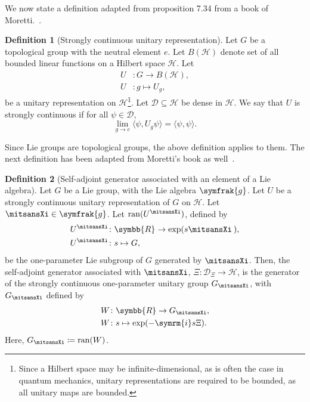 \documentclass[12pt, a4 paper]{article}
\let\symcal\mathcal
\theoremstyle{definition}
\newtheorem{defn}{Definition}
\newcommand{\rr}{\symbb{R}}
\newcommand{\hilbert}{\symcal{H}}
\renewcommand{\i}{\symrm{i}}
\newcommand{\domain}{\symcal{D}}
\begin{document}
    We now state a definition adapted from proposition 7.34 from a book of Moretti.~\cite[p.~287]{MorettiFundamental}.
    \begin{defn}[Strongly continuous unitary representation]
        Let \(G\) be a topological group with the neutral element \(e\). Let \(B(\hilbert)\) denote set of all bounded linear functions on a Hilbert space \(\hilbert\). Let
        \begin{align*}
            U &\colon G \rightarrow B(\hilbert),\\
            U &\colon g \mapsto U_g,
        \end{align*}
        be a unitary representation on \(\hilbert\)\footnote{Since a Hilbert space may be infinite-dimensional, as is often the case in quantum mechanics, unitary representations are required to be bounded, as all unitary maps are bounded.}. Let \(\domain \subseteq \hilbert\) be dense in \(\hilbert\). We say that \(U\) is strongly continuous if for all \(\psi \in \domain\),
        \[
            \lim_{g \rightarrow e} \langle\psi, U_g\psi\rangle = \langle\psi, \psi\rangle.
        \]
    \end{defn}
    Since Lie groups are topological groups, the above definition applies to them. The next definition has been adapted from Moretti's book as well~\cite[p.~288]{MorettiFundamental}.
    \begin{defn}[Self-adjoint generator associated with an element of a Lie algebra]
        Let \(G\) be a Lie group, with the Lie algebra \(\symfrak{g}\). Let \(U\) be a strongly continuous unitary representation of \(G\) on \(\hilbert\). Let \(\mitsansXi \in \symfrak{g}\). Let \(\operatorname{ran}(U^{\mitsansXi})\), defined by
        \begin{align*}
            U^{\mitsansXi} &\colon \rr \rightarrow \exp(s\mitsansXi\kern2.1pt),\\
            U^{\mitsansXi} &\colon s \mapsto G,
        \end{align*}
        be the one-parameter Lie subgroup of \(G\) generated by \(\mitsansXi\). Then, the self-adjoint generator associated with \(\mitsansXi\), \(\Xi \colon \domain_{\Xi} \rightarrow \hilbert\), is the generator of the strongly continuous one-parameter unitary group \(G_{\mitsansXi}\), with \(G_{\mitsansXi}\) defined by
        \begin{align*}
            W &\colon \rr \rightarrow G_{\mitsansXi},\\
            W &\colon s \mapsto \exp(-\i s \Xi).
        \end{align*}
        Here, \(G_{\mitsansXi} \coloneq \operatorname{ran}(W)\).
    \end{defn}
\end{document}
